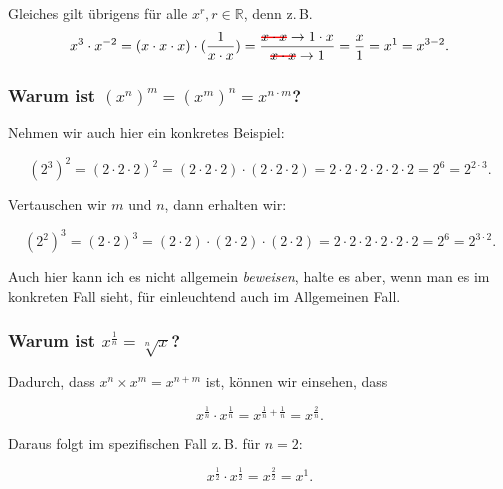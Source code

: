 \documentclass{scrartcl}
\newcommand\hcancel[2][black]{\setbox0=\hbox{$#2$}%
\rlap{\raisebox{.45\ht0}{\textcolor{#1}{\rule{\wd0}{1pt}}}}#2}
\begin{document}
Gleiches gilt übrigens für alle $x^r, r\in\mathbb{R}$, denn z.\,B.
\begin{equation}
	x^3 \cdot x^{-2} = (x \cdot x \cdot x) \cdot (\frac{1}{x\cdot x}) = 
	\frac{\hcancel[red]{x\cdot x}\rightarrow 1\cdot x}{\hcancel[red]{x\cdot x}\rightarrow 1} =
	\frac{x}{1} = x^1 = x^{3 - 2}.
\end{equation}

\subsubsection{Warum ist $\left(x^n\right)^m = \left(x^m\right)^n = x^{n\cdot m}$?}

\label{warumxhochn}

Nehmen wir auch hier ein konkretes Beispiel:

\begin{equation}
	\left(2^3\right)^2 = \left(2\cdot 2 \cdot 2\right)^2 = \left(2\cdot 2 \cdot 2\right) \cdot \left(2\cdot 2 \cdot 2\right) = 
	2\cdot 2 \cdot 2 \cdot 2\cdot 2 \cdot 2 = 2^6 = 2^{2\cdot 3}.
\end{equation}

Vertauschen wir $m$ und $n$, dann erhalten wir:

\begin{equation}
	\left(2^2\right)^3 = \left(2\cdot 2\right)^3 = \left(2\cdot 2\right) \cdot \left(2\cdot 2\right) \cdot \left(2\cdot 2\right) =
	2\cdot 2 \cdot 2 \cdot 2\cdot 2 \cdot 2 = 2^6 = 2^{3\cdot 2}.
\end{equation}

Auch hier kann ich es nicht allgemein \textit{beweisen}, halte es aber, wenn man es im konkreten Fall sieht,
für einleuchtend auch im Allgemeinen Fall.

\subsubsection{Warum ist $x^{\frac{1}{n}} = \sqrt[n]{x}$?}

Dadurch, dass $x^n \times x^m = x^{n + m}$ ist, können wir einsehen, dass

\begin{equation}
	x^\frac{1}{n} \cdot x^\frac{1}{n} = x^{\frac{1}{n} + \frac{1}{n}} = x^\frac{2}{n}.
\end{equation}

Daraus folgt im spezifischen Fall z.\,B. für $n = 2$:

\begin{equation}
	x^\frac{1}{2} \cdot x^\frac{1}{2} = x^\frac{2}{2} = x^1.
\end{equation}
\end{document}
